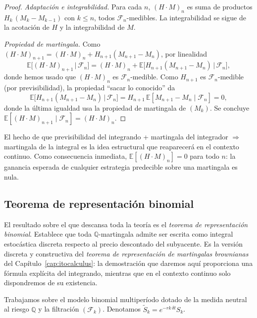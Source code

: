 \documentclass[11pt,a4paper,oneside]{report}
\theoremstyle{plain}
\theoremstyle{definition}
\theoremstyle{remark}
\newcommand{\E}{\mathbb{E}}
\newcommand{\Q}{\mathbb{Q}}
\newcommand{\F}{\mathcal{F}}
\newcommand{\1}{\mathbf{1}}
\begin{document}
\begin{proof}
\emph{Adaptación e integrabilidad.} Para cada $n$, $(H \cdot M)_n$ es
suma de productos $H_k\, (M_k - M_{k-1})$ con $k \leq n$, todos
$\F_n$-medibles. La integrabilidad se sigue de la acotación de $H$ y la
integrabilidad de $M$.

\emph{Propiedad de martingala.} Como $(H \cdot M)_{n+1} = (H \cdot
M)_n + H_{n+1}(M_{n+1} - M_n)$, por linealidad
\begin{equation*}
  \E\bigl[(H \cdot M)_{n+1} \,\big|\, \F_n\bigr]
  = (H \cdot M)_n + \E\bigl[H_{n+1}(M_{n+1} - M_n) \,\big|\, \F_n\bigr],
\end{equation*}
donde hemos usado que $(H\cdot M)_n$ es $\F_n$-medible. Como $H_{n+1}$
es $\F_n$-medible (por previsibilidad), la propiedad ``sacar lo
conocido'' da
\begin{equation*}
  \E\bigl[H_{n+1}(M_{n+1} - M_n) \,\big|\, \F_n\bigr]
  = H_{n+1}\, \E[M_{n+1} - M_n \mid \F_n] = 0,
\end{equation*}
donde la última igualdad usa la propiedad de martingala de $(M_k)$. Se
concluye $\E[(H \cdot M)_{n+1} \mid \F_n] = (H \cdot M)_n$.
\end{proof}

El hecho de que previsibilidad del integrando + martingala del
integrador $\Rightarrow$ martingala de la integral es la idea
estructural que reaparecerá en el contexto continuo. Como
consecuencia inmediata, $\E[(H \cdot M)_n] = 0$ para todo $n$: la
ganancia esperada de cualquier estrategia predecible sobre una
martingala es nula.

\subsection{Teorema de representación binomial}
\label{subsec:representacion_binomial}

El resultado sobre el que descansa toda la teoría es el
\emph{teorema de representación binomial}. Establece que toda
$\Q$-martingala admite ser escrita como integral estocástica discreta
respecto al precio descontado del subyacente. Es la versión discreta y
constructiva del \emph{teorema de representación de martingalas
brownianas} del Capítulo~\ref{cap:itocalculus}: la demostración que
daremos aquí proporciona una fórmula explícita del integrando, mientras
que en el contexto continuo solo dispondremos de su existencia.

Trabajamos sobre el modelo binomial multiperíodo dotado de la medida
neutral al riesgo $\Q$ y la filtración $(\F_k)$. Denotamos $\widetilde
S_k = e^{-r k\, \delta t} S_k$.
\end{document}
